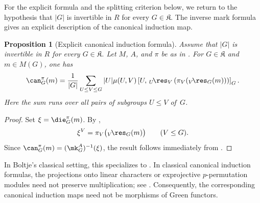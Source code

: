 \documentclass{amsart}
\numberwithin{equation}{section}%
\newtheorem{Prop}[equation]{Proposition}
\theoremstyle{remark}
\theoremstyle{definition}
\newcommand{\lres}[1]{{}_{#1}\!\res}
\begin{document}
%
For the explicit formula and the splitting criterion below, we return
to the hypothesis that $|G|$ is invertible in $R$ for every
$G\in\mathfrak K$.
The inverse mark formula gives an explicit description of the
canonical induction map.
%
\begin{Prop}[Explicit canonical induction formula]
\label{prop:canonical-induction-formula}
Assume that $|G|$ is invertible in $R$ for every
$G\in\mathfrak K$.
Let $M$, $A$, and $\pi$ be as in
.
For $G\in\mathfrak K$ and $m\in M(G)$, one has
%
\[
\can_G^\pi(m)
=
\frac{1}{|G|}
\sum_{U\leq V\leq G}
|U|\mu(U,V)
\left[
U,\,
{}\lres{U}_V
\left(
\pi_V({}\lres{V}_G(m))
\right)
\right]_G.
\]
%
Here the sum runs over all pairs of subgroups $U\leq V$ of~$G$.
\end{Prop}
%
\begin{proof}
Set $\xi=\die_G^\pi(m)$. By
,
%
\[
\xi^V=\pi_V\bigl({}\lres{V}_G(m)\bigr)
\qquad (V\leq G).
\]
%
Since $\can_G^\pi(m)=(\mk_G^A)^{-1}(\xi)$, the result follows
immediately from .
\end{proof}
%
In Boltje's classical setting, this specializes to
\cite[Eq.~(6.1a)]{Boltje98a}.
In classical canonical induction formulas, the projections
onto linear characters or exprojective $p$-permutation
modules need not preserve multiplication; see
\cite{Boltje98a,BarkerMutlu19}.
Consequently, the corresponding canonical induction
maps need not be morphisms of Green functors.
%
\end{document}
